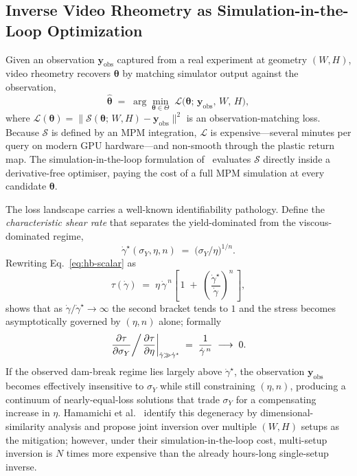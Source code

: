 \subsection{Inverse Video Rheometry as Simulation-in-the-Loop Optimization}

Given an observation $\mathbf{y}_{\mathrm{obs}}$ captured from a real
experiment at geometry $(W, H)$, video rheometry recovers
$\boldsymbol{\theta}$ by matching simulator output against the
observation,
\begin{equation}
\label{eq:inverse-generic}
    \hat{\boldsymbol{\theta}}
    \;=\;
    \arg\min_{\boldsymbol{\theta}\in\Theta}\;
    \mathcal{L}\bigl(\boldsymbol{\theta};\,
    \mathbf{y}_{\mathrm{obs}},\,W,\,H\bigr),
\end{equation}
where
$\mathcal{L}(\boldsymbol{\theta}) = \|\mathcal{S}(\boldsymbol{\theta};\,W,H)
- \mathbf{y}_{\mathrm{obs}}\|^{2}$ is an observation-matching loss.
Because $\mathcal{S}$ is defined by an MPM integration,
$\mathcal{L}$ is expensive---several minutes per query on modern
GPU hardware---and non-smooth through the plastic return map. The
simulation-in-the-loop formulation of~\cite{hamamichi2023nonnewtonian}
evaluates $\mathcal{S}$ directly inside a derivative-free optimiser,
paying the cost of a full MPM simulation at every candidate
$\boldsymbol{\theta}$.

The loss landscape carries a well-known identifiability pathology.
Define the \emph{characteristic shear rate} that separates the
yield-dominated from the viscous-dominated regime,
\begin{equation}
\label{eq:gammastar}
    \dot\gamma^{\star}(\sigma_Y, \eta, n)
    \;=\; \bigl(\sigma_Y / \eta\bigr)^{1/n}.
\end{equation}
Rewriting Eq.~\eqref{eq:hb-scalar} as
\begin{equation}
\label{eq:hb-factored}
    \tau(\dot\gamma)
    \;=\; \eta\,\dot\gamma^{\,n}\left[\,1
    \;+\; \left(\frac{\dot\gamma^{\star}}{\dot\gamma}\right)^{\!n}\,\right],
\end{equation}
shows that as $\dot\gamma / \dot\gamma^{\star} \to \infty$ the
second bracket tends to $1$ and the stress becomes asymptotically
governed by $(\eta, n)$ alone; formally
\begin{equation}
\label{eq:ridge}
    \left.
      \frac{\partial \tau}{\partial \sigma_Y}
    \right/\!
    \left.
      \frac{\partial \tau}{\partial \eta}
    \right|_{\dot\gamma \gg \dot\gamma^{\star}}
    \;=\;
    \frac{1}{\dot\gamma^{\,n}}
    \;\longrightarrow\; 0.
\end{equation}
If the observed dam-break regime lies largely above
$\dot\gamma^{\star}$, the observation $\mathbf{y}_{\mathrm{obs}}$
becomes effectively insensitive to $\sigma_Y$ while still constraining
$(\eta, n)$, producing a continuum of nearly-equal-loss solutions
that trade $\sigma_Y$ for a compensating increase in $\eta$.
Hamamichi et al.~\cite{hamamichi2023nonnewtonian} identify this
degeneracy by dimensional-similarity analysis and propose joint
inversion over multiple $(W, H)$ setups as the mitigation; however,
under their simulation-in-the-loop cost, multi-setup inversion is
$N$ times more expensive than the already hours-long single-setup
inverse.

